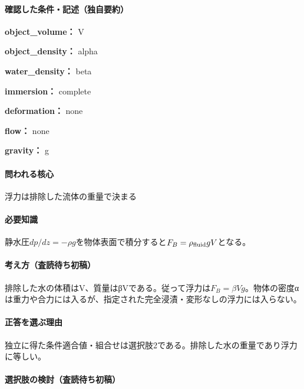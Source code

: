 \paragraph{確認した条件・記述（独自要約）}\mbox{}\par

\noindent\textbf{object\_volume：} V\par

\noindent\textbf{object\_density：} alpha\par

\noindent\textbf{water\_density：} beta\par

\noindent\textbf{immersion：} complete\par

\noindent\textbf{deformation：} none\par

\noindent\textbf{flow：} none\par

\noindent\textbf{gravity：} g\par

\paragraph{問われる核心} 浮力は排除した流体の重量で決まる

\paragraph{必要知識} 静水圧\(dp/dz=-\rho g\)を物体表面で積分すると\(F_B=\rho_{\rm fluid}gV\)となる。

\paragraph{考え方（査読待ち初稿）} 排除した水の体積はV、質量はβVである。従って浮力は\(F_B=\beta Vg\)。物体の密度αは重力や合力には入るが、指定された完全浸漬・変形なしの浮力には入らない。

\paragraph{正答を選ぶ理由} 独立に得た条件適合値・組合せは選択肢2である。排除した水の重量であり浮力に等しい。

\paragraph{選択肢の検討（査読待ち初稿）}\mbox{}\par

